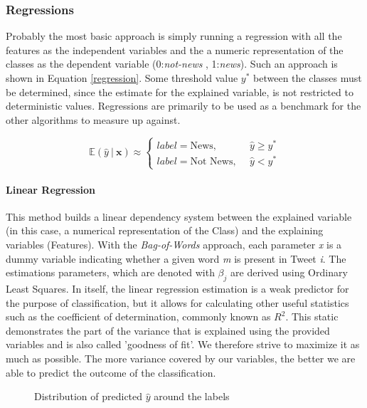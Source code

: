 	\subsubsection{Regressions}
	Probably the most basic approach is simply running a regression with all the features as the independent variables and the a numeric representation of the classes as the dependent variable (0:\textit{not-news} , 1:\textit{news}). Such an approach is shown in Equation \ref{regression}. Some threshold value $ y^* $ between the classes must be determined, since the estimate for the explained variable, is not restricted to deterministic values. Regressions are primarily to be used as a benchmark for the other algorithms to measure up against.
	
	\begin{equation}
		\mathbb{E}(\hat{y} \ \vert \ \textbf{x}) \approx 
		\begin{cases}
			label = \text{News}, &\hat{y} \geq y^* \\
			label = \text{Not News},\ \ &\hat{y} < y^*
		\end{cases}
		\label{regression}
	\end{equation}
	
	\par
	\paragraph{Linear Regression}
		This method builds a linear dependency system between the explained variable (in this case, a numerical representation of the Class) and the explaining variables (Features). With the \textit{Bag-of-Words} approach, each parameter \textit{x} is a dummy variable indicating whether a given word \textit{m} is present in Tweet \textit{i}. The estimations parameters, which are denoted with $\beta_j$ are derived using Ordinary Least Squares. In itself, the linear regression estimation is a weak predictor for the purpose of classification, but it allows for calculating other useful statistics such as the coefficient of determination, commonly known as $R^2$. This static demonstrates the part of the variance that is explained using the provided variables and is also called 'goodness of fit'. We therefore strive to maximize it as much as possible. The more variance covered by our variables, the better we are able to predict the outcome of the classification. 
		
		\begin{figure}[h]
			\centering
			\scalebox{0.8}{
				
			}
			\captionsetup{width=0.8\textwidth}
			\caption{Distribution of predicted $ \hat{y} $ around the labels}
			\label{fig:y_dist_reg}
		\end{figure}
		
